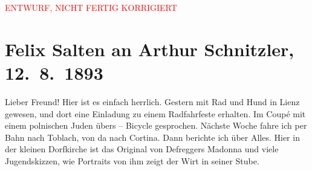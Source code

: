 
\begin{center}
            \textcolor{red}{ENTWURF, NICHT FERTIG KORRIGIERT}
                      \end{center}
            
         
         \renewcommand{\erwaehntePersonen}{Personen: Franz Defregger, Gustav Schwarzkopf, Emil Schwarzkopf, Max Schwarzkopf, Rudolf Schwarzkopf}
         \renewcommand{\erwaehnteOrte}{Orte: Cortina d'Ampezzo, Dölsach, Lienz, Pfarrkirche Dölsach, Toblach, Wien}
         \renewcommand{\erwaehnteWerke}{Werke: Heilige Familie}
               \section[Felix Salten an Arthur Schnitzler, 12. 8. 1893]{ Felix Salten an Arthur Schnitzler, 12. 8. 1893}\nopagebreak{}\rehead{ }\begin{ledgroupsized}[t]{13cm}\normalsize\beginnumbering \toendnotes[C]{\smallbreak\pagebreak[2]} 
\toendnotes[C]{\smallbreak}\pstart
           \noindent{}{\pb}Lieber Freund! Hier ist es einfach herrlich. Gestern mit Rad und
               Hund in Lienz gewesen, und dort eine Einladung zu einem
               Radfahrfeste erhalten. Im Coupé mit einem polnischen Juden übers – Bicycle
               gesprochen. Nächste Woche fahre ich per Bahn nach Toblach, von da nach Cortina. Dann
               berichte ich über Alles. \pend
           \pstart
           Hier in der kleinen Dorfkirche ist das Original von Defreggers Madonna und viele
               Jugendskizzen, wie Portraits von ihm zeigt der Wirt in seiner Stube. \pend

\end{ledgroupsized}
